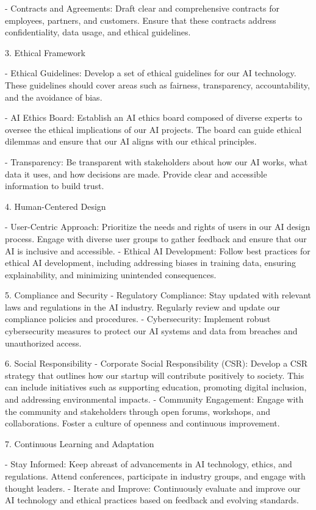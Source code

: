 \documentclass[12pt,letterpaper]{article}
\begin{document}
- Contracts and Agreements: Draft clear and comprehensive contracts for employees, partners, and customers. Ensure that these contracts address confidentiality, data usage, and ethical guidelines.

 3. Ethical Framework

- Ethical Guidelines: Develop a set of ethical guidelines for our AI technology. These guidelines should cover areas such as fairness, transparency, accountability, and the avoidance of bias.

- AI Ethics Board: Establish an AI ethics board composed of diverse experts to oversee the ethical implications of our AI projects. The board can guide ethical dilemmas and ensure that our AI aligns with our ethical principles.

- Transparency: Be transparent with stakeholders about how our AI works, what data it uses, and how decisions are made. Provide clear and accessible information to build trust.

 4. Human-Centered Design

- User-Centric Approach: Prioritize the needs and rights of users in our AI design process. Engage with diverse user groups to gather feedback and ensure that our AI is inclusive and accessible.
- Ethical AI Development: Follow best practices for ethical AI development, including addressing biases in training data, ensuring explainability, and minimizing unintended consequences.



 5. Compliance and Security
- Regulatory Compliance: Stay updated with relevant laws and regulations in the AI industry. Regularly review and update our compliance policies and procedures.
- Cybersecurity: Implement robust cybersecurity measures to protect our AI systems and data from breaches and unauthorized access.

 6. Social Responsibility
- Corporate Social Responsibility (CSR): Develop a CSR strategy that outlines how our startup will contribute positively to society. This can include initiatives such as supporting education, promoting digital inclusion, and addressing environmental impacts.
- Community Engagement: Engage with the community and stakeholders through open forums, workshops, and collaborations. Foster a culture of openness and continuous improvement.

 7. Continuous Learning and Adaptation

- Stay Informed: Keep abreast of advancements in AI technology, ethics, and regulations. Attend conferences, participate in industry groups, and engage with thought leaders.
- Iterate and Improve: Continuously evaluate and improve our AI technology and ethical practices based on feedback and evolving standards.
\end{document}
